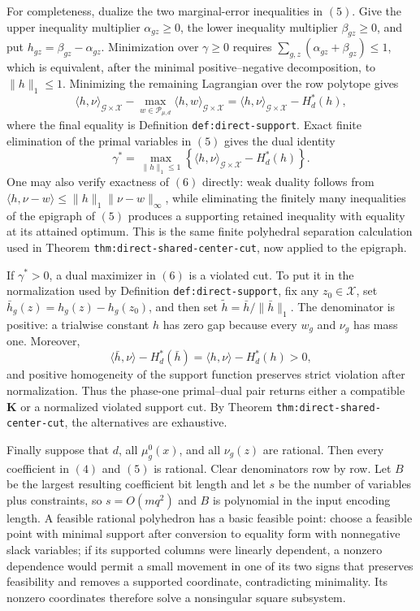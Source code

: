 For completeness, dualize the two marginal-error inequalities in \((5)\).  Give the upper inequality multiplier \(\alpha_{gz}\ge0\), the lower inequality multiplier \(\beta_{gz}\ge0\), and put \(h_{gz}=\beta_{gz}-\alpha_{gz}\).  Minimization over \(\gamma\ge0\) requires
\(\sum_{g,z}(\alpha_{gz}+\beta_{gz})\le1\), which is equivalent, after the minimal positive--negative decomposition, to \(\|h\|_1\le1\).  Minimizing the remaining Lagrangian over the row polytope gives
\[
 \langle h,\nu\rangle_{\mathcal G\times\mathcal X}
 -\max_{w\in\mathcal P_{\mu,d}}
      \langle h,w\rangle_{\mathcal G\times\mathcal X}
 =\langle h,\nu\rangle_{\mathcal G\times\mathcal X}-H_d^*(h),
\]
where the final equality is Definition \texttt{def:direct-support}.  Exact finite elimination of the primal variables in \((5)\) gives the dual identity
\[
 \gamma^*
 =\max_{\|h\|_1\le1}
   \left\{\langle h,\nu\rangle_{\mathcal G\times\mathcal X}-H_d^*(h)\right\}.
 \tag{6}
\]
One may also verify exactness of \((6)\) directly: weak duality follows from
\(\langle h,\nu-w\rangle\le\|h\|_1\|\nu-w\|_\infty\), while eliminating the finitely many inequalities of the epigraph of \((5)\) produces a supporting retained inequality with equality at its attained optimum.  This is the same finite polyhedral separation calculation used in Theorem \texttt{thm:direct-shared-center-cut}, now applied to the epigraph.

If \(\gamma^*>0\), a dual maximizer in \((6)\) is a violated cut.  To put it in the normalization used by Definition \texttt{def:direct-support}, fix any \(z_0\in\mathcal X\), set
\(\bar h_g(z)=h_g(z)-h_g(z_0)\), and then set
\(\widetilde h=\bar h/\|\bar h\|_1\).  The denominator is positive: a trialwise constant \(h\) has zero gap because every \(w_g\) and \(\nu_g\) has mass one.  Moreover,
\[
 \langle \bar h,\nu\rangle-H_d^*(\bar h)
 =\langle h,\nu\rangle-H_d^*(h)>0,
\]
and positive homogeneity of the support function preserves strict violation after normalization.  Thus the phase-one primal--dual pair returns either a compatible \(\mathbf K\) or a normalized violated support cut.  By Theorem \texttt{thm:direct-shared-center-cut}, the alternatives are exhaustive.

Finally suppose that \(d\), all \(\mu_g^0(x)\), and all \(\nu_g(z)\) are rational.  Then every coefficient in \((4)\) and \((5)\) is rational.  Clear denominators row by row.  Let \(B\) be the largest resulting coefficient bit length and let \(s\) be the number of variables plus constraints, so \(s=O(mq^2)\) and \(B\) is polynomial in the input encoding length.  A feasible rational polyhedron has a basic feasible point: choose a feasible point with minimal support after conversion to equality form with nonnegative slack variables; if its supported columns were linearly dependent, a nonzero dependence would permit a small movement in one of its two signs that preserves feasibility and removes a supported coordinate, contradicting minimality.  Its nonzero coordinates therefore solve a nonsingular square subsystem.

